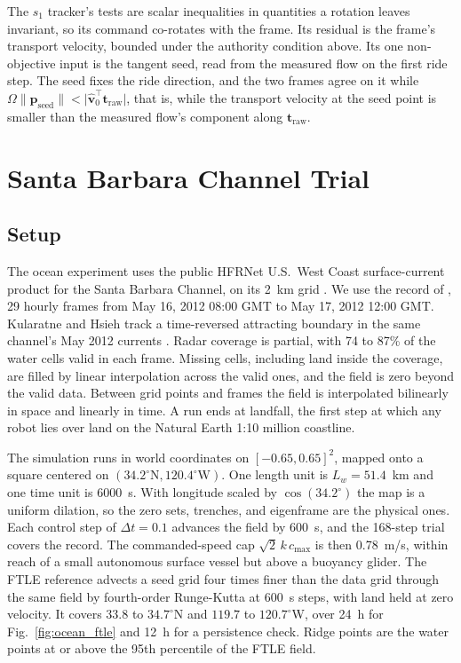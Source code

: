 \documentclass[lettersize,journal]{IEEEtran}
\begin{document}
The $s_1$ tracker's tests are scalar inequalities in quantities a rotation
leaves invariant, so its command co-rotates with the frame. Its residual is
the frame's transport velocity, bounded under the authority condition above. Its one non-objective input is the tangent
seed, read from the measured flow on the first ride step. The seed fixes
the ride direction, and the two frames agree on it while
$\Omega\lVert\mathbf{p}_{\text{seed}}\rVert <
\lvert\hat{\mathbf{v}}_0^\top\mathbf{t}_{\text{raw}}\rvert$, that is, while
the transport velocity at the seed point is smaller than the measured
flow's component along $\mathbf{t}_{\text{raw}}$.

\section{Santa Barbara Channel Trial}
\label{sec:ocean}

\subsection{Setup}
\label{sec:ocean_sim}

The ocean experiment uses the public HFRNet U.S.~West Coast surface-current
product for the Santa Barbara Channel, on its 2~km grid \cite{34,38}. We
use the record of \cite{26}, 29 hourly frames from May 16, 2012 08:00 GMT
to May 17, 2012 12:00 GMT. Kularatne and Hsieh track a time-reversed
attracting boundary in the same channel's May 2012 currents \cite{29}.
Radar coverage is partial, with 74 to 87\% of the water cells valid in
each frame. Missing cells, including land inside the coverage, are filled
by linear interpolation across the valid ones, and the field is zero
beyond the valid data. Between grid points and frames the field is
interpolated bilinearly in space and linearly in time. A run ends at
landfall, the first step at which any robot lies over land on the Natural
Earth 1:10 million coastline.

The simulation runs in world coordinates on $[-0.65, 0.65]^2$, mapped onto
a square centered on $(34.2^{\circ}\mathrm{N}, 120.4^{\circ}\mathrm{W})$.
One length unit is $L_w = 51.4$~km and one time unit is 6000~s. With
longitude scaled by $\cos(34.2^{\circ})$ the map is a uniform dilation, so
the zero sets, trenches, and eigenframe are the physical ones. Each control
step of $\Delta t = 0.1$ advances the field by 600~s, and the 168-step trial
covers the record. The commanded-speed cap $\sqrt{2}\,k\,c_{\max}$ is then
0.78~m/s, within reach of a small autonomous surface vessel but above a
buoyancy glider. The FTLE reference advects a seed grid four times finer than the data grid
through the same field by fourth-order Runge-Kutta at 600~s steps, with
land held at zero velocity. It covers $33.8$ to $34.7^{\circ}$N and $119.7$
to $120.7^{\circ}$W, over 24~h for Fig.~\ref{fig:ocean_ftle} and 12~h for
a persistence check. Ridge points are the water points at or above the
95th percentile of the FTLE field.
\end{document}
